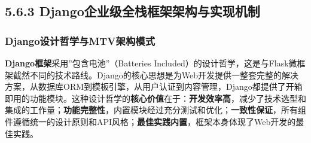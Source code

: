 \begin{Shaded}
\begin{Highlighting}[]
\NormalTok{)                    }
\NormalTok{)  }

\NormalTok{)}

\end{Highlighting}
\end{Shaded}

\subsection{5.6.3 Django企业级全栈框架架构与实现机制}\label{djangoux4f01ux4e1aux7ea7ux5168ux6808ux6846ux67b6ux67b6ux6784ux4e0eux5b9eux73b0ux673aux5236}

\subsubsection{Django设计哲学与MTV架构模式}\label{djangoux8bbeux8ba1ux54f2ux5b66ux4e0emtvux67b6ux6784ux6a21ux5f0f}

\textbf{Django框架}采用''包含电池''（Batteries Included）的设计哲学，这是与Flask微框架截然不同的技术路线。Django的核心思想是为Web开发提供一整套完整的解决方案，从数据库ORM到模板引擎，从用户认证到内容管理，Django都提供了开箱即用的功能模块。这种设计哲学的\textbf{核心价值}在于：\textbf{开发效率高}，减少了技术选型和集成的工作量；\textbf{功能完整性}，内置模块经过充分测试和优化；\textbf{一致性保证}，所有组件遵循统一的设计原则和API风格；\textbf{最佳实践内置}，框架本身体现了Web开发的最佳实践。

